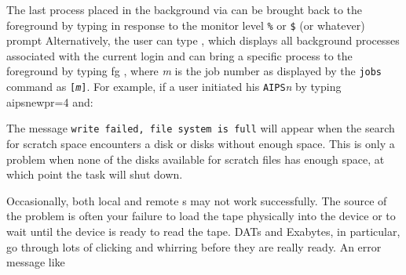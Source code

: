      The last process placed in the background via {\tt {}}
can be brought back to the foreground by typing {\us {} \CR} in
response to the monitor level {\tt \%} or {\tt \$} (or whatever) prompt
Alternatively, the user can type {\us\qs {} \CR}, which
displays all background processes associated with the current login
and can bring a specific process to the foreground by typing {\us
fg \CR}, where {\it m} is the job number as displayed by
the {\tt jobs} command as {\tt [{\it m}]}.  For example, if a user
initiated his {\tt AIPS}{\it n} by typing {\us aips\qs new\qs pr=4\CR}
and:
\pd

\vfill\eject
{}

     The message {\tt write failed, file system is full} will appear
when the search for scratch space encounters a disk or disks without
enough space.  This is only a problem when none of the disks available
for scratch files has enough space, at which point the task will shut
down.


   Occasionally, both local and remote s may not work
successfully.  The source of the problem is often your failure to load
the tape physically into the device or to wait until the device is
ready to read the tape.  DATs and Exabytes, in particular, go through
lots of clicking and whirring before they are really ready.  An error
message like

